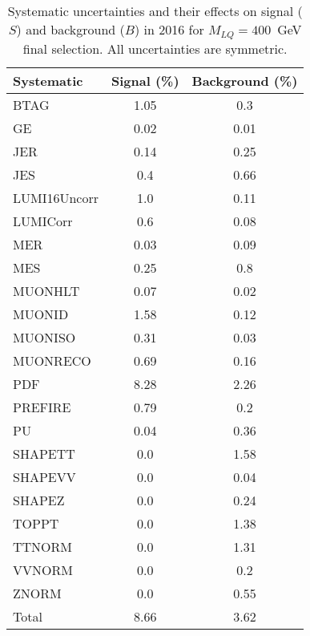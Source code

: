 \begin{table}[htbp]
\begin{center}
\caption{Systematic uncertainties and their effects on signal ($S$) and background ($B$) in 2016 for $M_{LQ}=400$~GeV final selection. All uncertainties are symmetric.}
\begin{tabular}{lcc}
\hline\hline
Systematic & Signal (\%) & Background (\%) \\ \hline 
BTAG & 1.05 & 0.3\\ 
GE & 0.02 & 0.01\\ 
JER & 0.14 & 0.25\\ 
JES & 0.4 & 0.66\\ 
LUMI16Uncorr & 1.0 & 0.11\\ 
LUMICorr & 0.6 & 0.08\\ 
MER & 0.03 & 0.09\\ 
MES & 0.25 & 0.8\\ 
MUONHLT & 0.07 & 0.02\\ 
MUONID & 1.58 & 0.12\\ 
MUONISO & 0.31 & 0.03\\ 
MUONRECO & 0.69 & 0.16\\ 
PDF & 8.28 & 2.26\\ 
PREFIRE & 0.79 & 0.2\\ 
PU & 0.04 & 0.36\\ 
SHAPETT & 0.0 & 1.58\\ 
SHAPEVV & 0.0 & 0.04\\ 
SHAPEZ & 0.0 & 0.24\\ 
TOPPT & 0.0 & 1.38\\ 
TTNORM & 0.0 & 1.31\\ 
VVNORM & 0.0 & 0.2\\ 
ZNORM & 0.0 & 0.55\\ 
Total & 8.66 & 3.62\\ \hline \hline
\end{tabular}
\label{tab:SysUncertainties_uujj_400}
\end{center}
\end{table}

